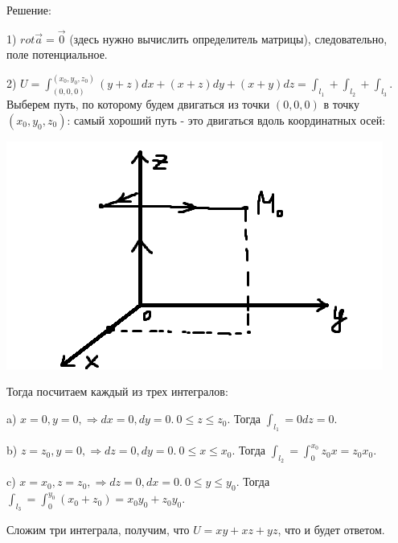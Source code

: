 \documentclass[12pt]{article}
\begin{document}
Решение:\par
1) $rot \overrightarrow{a} = \overrightarrow{0}$ (здесь нужно вычислить определитель матрицы), следовательно, поле потенциальное.\par
2) $U = \int_{(0,0,0)}^{(x_0,y_0,z_0)} (y+z) dx + (x+z) dy + (x + y) dz = \int_{l_1} + \int_{l_2} + \int_{l_3}$. Выберем путь, по которому будем двигаться из точки $(0,0,0)$ в точку $(x_0,y_0,z_0)$: самый хороший путь - это двигаться вдоль координатных осей:\par
\includegraphics{scalarPotential1}\par
Тогда посчитаем каждый из трех интегралов:\par
a) $x = 0, y = 0, \Rightarrow dx = 0, dy = 0. \ 0 \leq z \leq z_0$. Тогда $\int_{l_1} = 0dz = 0$.\par
b) $z = z_0, y = 0, \Rightarrow dz = 0, dy = 0. \ 0 \leq x \leq x_0$. Тогда $\int_{l_2} = \int_0^{x_0} z_0 x = z_0 x_0$.\par
c) $x = x_0, z = z_0, \Rightarrow dz = 0, dx = 0. \ 0 \leq y \leq y_0$. Тогда $\int_{l_3} = \int_0^{y_0} (x_0 + z_0) = x_0 y_0 + z_0 y_0$.\par
Сложим три интеграла, получим, что $U = xy + xz + yz$, что и будет ответом.\par
\end{document}

